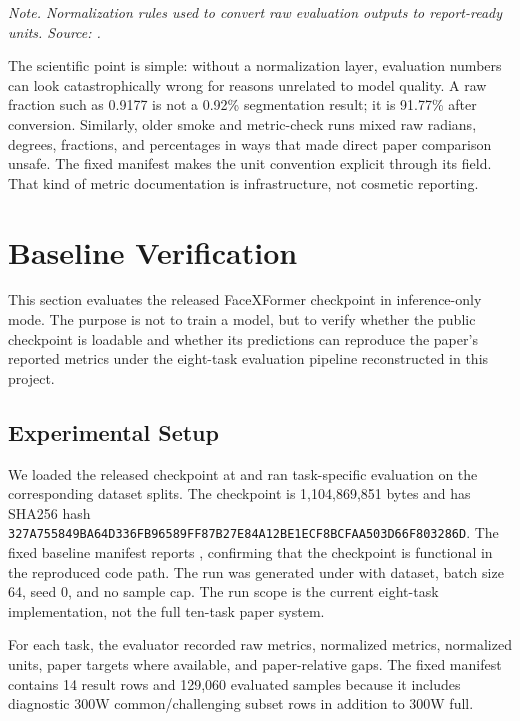 \documentclass[11pt]{article}
\begin{document}
\emph{Note. Normalization rules used to convert raw evaluation outputs to report-ready units. Source: .}

The scientific point is simple: without a normalization layer, evaluation numbers can look catastrophically wrong for reasons unrelated to model quality. A raw fraction such as 0.9177 is not a 0.92\% segmentation result; it is 91.77\% after conversion. Similarly, older smoke and metric-check runs mixed raw radians, degrees, fractions, and percentages in ways that made direct paper comparison unsafe. The fixed manifest makes the unit convention explicit through its  field. That kind of metric documentation is infrastructure, not cosmetic reporting.


\section{Baseline Verification}


This section evaluates the released FaceXFormer checkpoint in inference-only mode. The purpose is not to train a model, but to verify whether the public checkpoint is loadable and whether its predictions can reproduce the paper's reported metrics under the eight-task evaluation pipeline reconstructed in this project.


\subsection{Experimental Setup}


We loaded the released checkpoint at  and ran task-specific evaluation on the corresponding dataset splits. The checkpoint is 1,104,869,851 bytes and has SHA256 hash \texttt{327A755849BA64D3\allowbreak{}36FB96589FF87B27\allowbreak{}E84A12BE1ECF8BCF\allowbreak{}AA503D66F803286D}. The fixed baseline manifest reports , confirming that the checkpoint is functional in the reproduced code path. The run was generated under  with dataset, batch size 64, seed 0, and no sample cap. The run scope is the current eight-task implementation, not the full ten-task paper system.


For each task, the evaluator recorded raw metrics, normalized metrics, normalized units, paper targets where available, and paper-relative gaps. The fixed manifest contains 14 result rows and 129,060 evaluated samples because it includes diagnostic 300W common/challenging subset rows in addition to 300W full.
\end{document}
